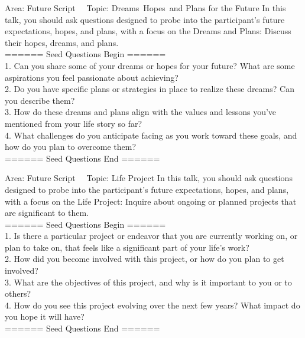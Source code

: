 \begin{mybox}{Area: Future Script \ \ Topic: Dreams\, Hopes\, and Plans for the Future}
In this talk, you should ask questions designed to probe into the participant’s future expectations, hopes, and plans, with a focus on the Dreams and Plans: Discuss their hopes, dreams, and plans. \\
====== Seed Questions Begin ====== \\
1. Can you share some of your dreams or hopes for your future? What are some aspirations you feel passionate about achieving? \\
2. Do you have specific plans or strategies in place to realize these dreams? Can you describe them? \\
3. How do these dreams and plans align with the values and lessons you've mentioned from your life story so far? \\
4. What challenges do you anticipate facing as you work toward these goals, and how do you plan to overcome them? \\
====== Seed Questions End ====== \\
\end{mybox}

\begin{mybox}{Area: Future Script \ \ Topic: Life Project}
In this talk, you should ask questions designed to probe into the participant’s future expectations, hopes, and plans, with a focus on the Life Project: Inquire about ongoing or planned projects that are significant to them. \\
====== Seed Questions Begin ====== \\
1. Is there a particular project or endeavor that you are currently working on, or plan to take on, that feels like a significant part of your life's work? \\
2. How did you become involved with this project, or how do you plan to get involved? \\
3. What are the objectives of this project, and why is it important to you or to others? \\
4. How do you see this project evolving over the next few years? What impact do you hope it will have? \\
====== Seed Questions End ====== \\
\end{mybox}

